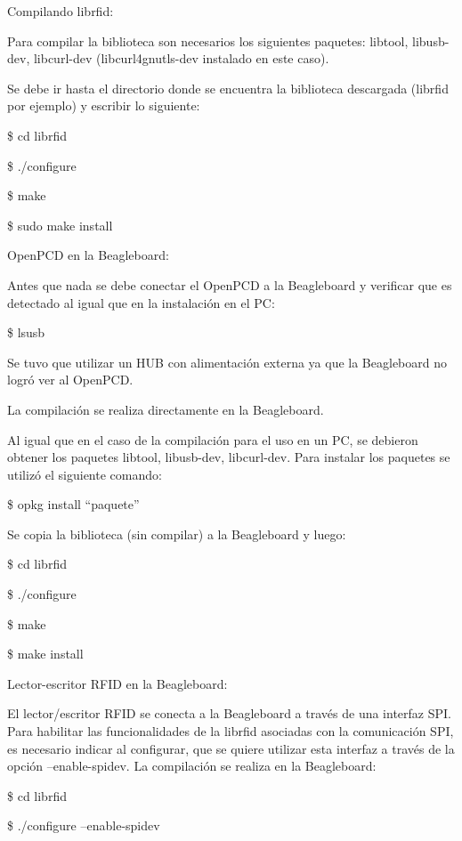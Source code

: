 \bigskip
Compilando librfid:

\bigskip
Para compilar la biblioteca son necesarios los siguientes paquetes: libtool, libusb-dev, libcurl-dev (libcurl4gnutls-dev instalado en este caso).

\bigskip
Se debe ir hasta el directorio donde se encuentra la biblioteca descargada (librfid por ejemplo) y escribir lo siguiente:

\bigskip
\centerline{\$ cd librfid}

\centerline{\$ ./configure}

\centerline{\$ make}

\centerline{\$ sudo make install}


\bigskip
OpenPCD en la Beagleboard:

\bigskip
Antes que nada se debe conectar el OpenPCD a la Beagleboard y verificar que es detectado al igual que en la instalación en el PC:

\bigskip
\centerline{\$ lsusb}

\bigskip
Se tuvo que utilizar un HUB con alimentación externa ya que la Beagleboard no logró ver al OpenPCD.

\bigskip
La compilación se realiza directamente en la Beagleboard.

\bigskip
Al igual que en el caso de la compilación para el uso en un PC, se debieron obtener los paquetes libtool, libusb-dev, libcurl-dev. Para instalar los paquetes se utilizó el siguiente comando:

\bigskip
\centerline{\$ opkg install “paquete”}
 
\bigskip
Se copia la biblioteca (sin compilar) a la Beagleboard y luego:

\bigskip
\centerline{\$ cd librfid}

\centerline{\$ ./configure}

\centerline{\$ make}

\centerline{\$ make install}


\bigskip
Lector-escritor RFID en la Beagleboard:

\bigskip
El lector/escritor RFID se conecta a la Beagleboard a través de una interfaz SPI.
Para habilitar las funcionalidades de la librfid asociadas con la comunicación SPI, es necesario indicar al configurar, que se quiere utilizar esta interfaz a través de la opción --enable-spidev. La compilación se realiza en la Beagleboard:

\bigskip
\centerline{\$ cd librfid}

\centerline{\$ ./configure --enable-spidev}

